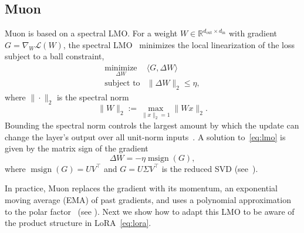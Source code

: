 \documentclass[11pt]{article}
\newcommand{\ip}[1]{\langle #1 \rangle}
\DeclareMathOperator{\msign}{msign}
\newcommand{\norm}[1]{\| #1\|}
\theoremstyle{plain}
\theoremstyle{definition}
\theoremstyle{remark}
\theoremstyle{definition}
\begin{document}
\subsection{Muon}\label{sec:muon}
Muon is based on a spectral LMO.
For a weight $W \in \mathbb{R}^{d_{\mathrm{out}} \times d_{\mathrm{in}}}$ with gradient $G = \nabla_W \mathcal{L}(W)$, the spectral LMO~\cite{bernstein2025modular,carlson2015preconditioned} minimizes the local linearization of the loss subject to a ball constraint,
\begin{equation}
 \begin{array}{ll}
  \underset{\Delta W}{\mathrm{minimize}} &
  \ip{G, \Delta W} \\[2pt]
  \mbox{subject to} &
  \displaystyle
  \norm{\Delta W}_2
  \le \eta,
  \end{array}
  \label{eq:lmo}
\end{equation}
where $\|\cdot\|_2$ is the spectral norm 
\[
\|W\|_2 := \max_{\|x\|_2 =1} \|W x \|_2.
\]
Bounding the spectral norm controls the largest amount by which the update can change the layer's output over all unit-norm inputs~\cite{yang2023spectral}.
A solution to~\eqref{eq:lmo} is given by the matrix sign of the gradient~\cite{bernstein2025modular}
\[
    \Delta W = -\eta \msign(G),
\]
where $\msign(G)=UV^\top$ and $G=U\Sigma V^\top$ is the reduced SVD (see~). 

In practice, Muon replaces the gradient with its momentum, an exponential
moving average (EMA) of past gradients, and uses a polynomial approximation
to the polar factor~\cite{polarexpress,gram_ns} (see ). Next we show how to adapt this LMO to be aware of the product structure in LoRA~\eqref{eq:lora}.
\end{document}
